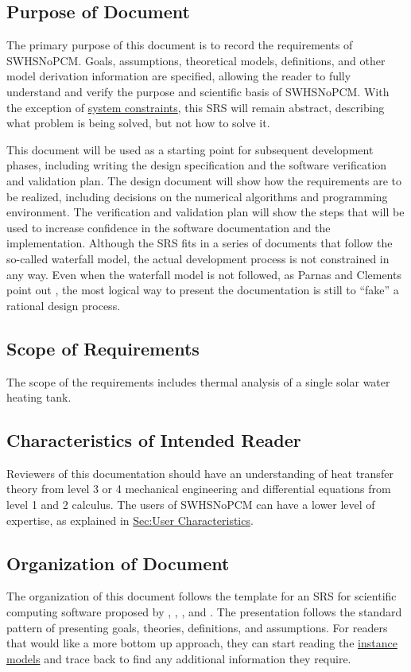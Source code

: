 \documentclass[12pt]{article}
\begin{document}
\subsection{Purpose of Document}
\label{Sec:DocPurpose}
The primary purpose of this document is to record the requirements of SWHSNoPCM. Goals, assumptions, theoretical models, definitions, and other model derivation information are specified, allowing the reader to fully understand and verify the purpose and scientific basis of SWHSNoPCM. With the exception of \hyperref[Sec:SysConstraints]{system constraints}, this SRS will remain abstract, describing what problem is being solved, but not how to solve it.

This document will be used as a starting point for subsequent development phases, including writing the design specification and the software verification and validation plan. The design document will show how the requirements are to be realized, including decisions on the numerical algorithms and programming environment. The verification and validation plan will show the steps that will be used to increase confidence in the software documentation and the implementation. Although the SRS fits in a series of documents that follow the so-called waterfall model, the actual development process is not constrained in any way. Even when the waterfall model is not followed, as Parnas and Clements point out \cite{parnasClements1986}, the most logical way to present the documentation is still to ``fake'' a rational design process.

\subsection{Scope of Requirements}
\label{Sec:ReqsScope}
The scope of the requirements includes thermal analysis of a single solar water heating tank.

\subsection{Characteristics of Intended Reader}
\label{Sec:ReaderChars}
Reviewers of this documentation should have an understanding of heat transfer theory from level 3 or 4 mechanical engineering and differential equations from level 1 and 2 calculus. The users of SWHSNoPCM can have a lower level of expertise, as explained in \hyperref[Sec:UserChars]{Sec:User Characteristics}.

\subsection{Organization of Document}
\label{Sec:DocOrg}
The organization of this document follows the template for an SRS for scientific computing software proposed by \cite{koothoor2013}, \cite{smithLai2005}, \cite{smithEtAl2007}, and \cite{smithKoothoor2016}. The presentation follows the standard pattern of presenting goals, theories, definitions, and assumptions. For readers that would like a more bottom up approach, they can start reading the \hyperref[Sec:IMs]{instance models} and trace back to find any additional information they require.
\end{document}
